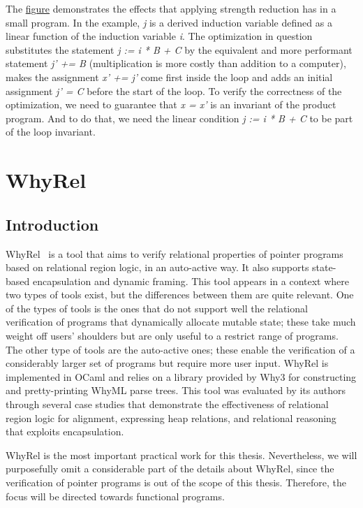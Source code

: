 The \hyperref[fig:induction_var_strength_red]{figure} demonstrates the effects that applying strength reduction has in a small program.
In the example, \emph{j} is a derived induction variable defined as a linear function of the induction variable \emph{i}.
The optimization in question substitutes the statement \emph{j := i * B + C} by the equivalent and more performant statement \emph{j' += B} (multiplication is more costly than addition to a computer), makes the assignment \emph{x' += j'} come first inside the loop and adds an initial assignment \emph{j' = C} before the start of the loop.
To verify the correctness of the optimization, we need to guarantee that \emph{x = x'} is an invariant of the product program.
And to do that, we need the linear condition \emph{j := i * B + C} to be part of the loop invariant.

\FloatBarrier
\section{WhyRel}
\label{sec:whyrel}

\subsection{Introduction}
\label{subsec:whyrel_intro}

WhyRel~\cite{whyrel} is a tool that aims to verify relational properties of pointer programs based on relational region logic, in an auto-active way.
It also supports state-based encapsulation and dynamic framing. 
This tool appears in a context where two types of tools exist, but the differences between them are quite relevant.
One of the types of tools is the ones that do not support well the relational verification of programs that dynamically allocate mutable state; these take much weight off users' shoulders but are only useful to a restrict range of programs.
The other type of tools are the auto-active ones; these enable the verification of a considerably larger set of programs but require more user input.
WhyRel is implemented in OCaml and relies on a library provided by Why3 for constructing and pretty-printing WhyML parse trees.
This tool was evaluated by its authors through several case studies that demonstrate the effectiveness of relational region logic for alignment, expressing heap relations, and relational reasoning that exploits encapsulation.

WhyRel is the most important practical work for this thesis.
Nevertheless, we will purposefully omit a considerable part of the details about WhyRel, since the verification of pointer programs is out of the scope of this thesis.
Therefore, the focus will be directed towards functional programs.


